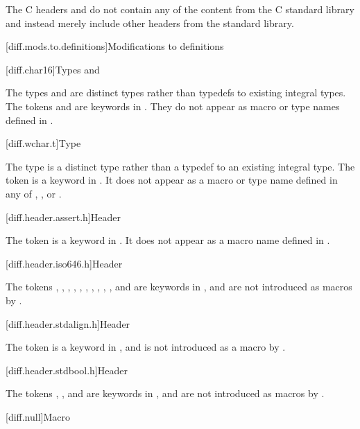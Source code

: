 \pnum
The C headers  and
 do not contain any of the content from
the C standard library and instead merely include other headers from the \Cpp{}
standard library.

[diff.mods.to.definitions]{Modifications to definitions}

[diff.char16]{Types  and }

\pnum
The types  and 
are distinct types rather than typedefs to existing integral types.
The tokens  and 
are keywords in \Cpp{}.
They do not appear as macro or type names defined in
.

[diff.wchar.t]{Type }

\pnum
The type  is a distinct type rather than a typedef to an
existing integral type.
The token 
is a keyword in \Cpp{}.
It does not appear as a macro or type name defined in any of
,
,
or .

[diff.header.assert.h]{Header }
%

\pnum
The token  is a keyword in \Cpp{}.
It does not appear as a macro name defined
in .

[diff.header.iso646.h]{Header }

\pnum
The tokens
,
,
,
,
,
,
,
,
,
,
and
are keywords in \Cpp{},
and are not introduced as macros
by .

[diff.header.stdalign.h]{Header }
%

\pnum
The token  is a keyword in \Cpp{},
and is not introduced as a macro
by .

[diff.header.stdbool.h]{Header }
%

\pnum
The tokens , , and 
are keywords in \Cpp{},
and are not introduced as macros
by .

[diff.null]{Macro }

